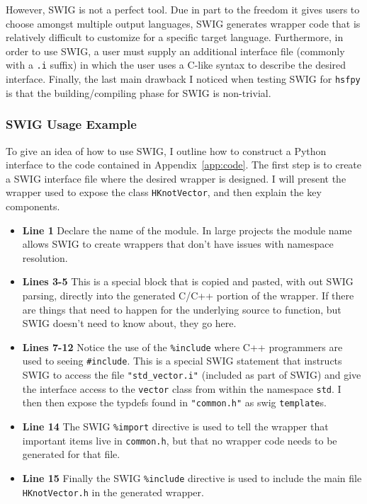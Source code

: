   However, SWIG is not a perfect tool. Due in part to the freedom it gives users to choose amongst multiple output languages, SWIG generates wrapper code that is relatively difficult to customize for a specific target language. Furthermore, in order to use SWIG, a user must supply an additional interface file (commonly with a \texttt{.i} suffix) in which the user uses a C-like syntax to describe the desired interface. Finally, the last main drawback I noticed when testing SWIG for \texttt{hsfpy} is that the building/compiling phase for SWIG is non-trivial.  

  \subsubsection{SWIG Usage Example} \label{ssub:swig_usage_example}

    To give an idea of how to use SWIG, I outline how to construct a Python interface to the code contained in Appendix~\ref{app:code}. The first step is to create a SWIG interface file where the desired wrapper is designed. I will present the wrapper used to expose the class \texttt{HKnotVector}, and then explain the key components.

    \vspace{.2in}
    

    \begin{itemize}
      \item \textbf{Line 1} Declare the name of the module. In large projects the module name allows SWIG to create wrappers that don't have issues with namespace resolution.
      \item \textbf{Lines 3-5} This is a special block that is copied and pasted, with out SWIG parsing, directly into the generated C/C++ portion of the wrapper. If there are things that need to happen for the underlying source to function, but SWIG doesn't need to know about, they go here.
      \item \textbf{Lines 7-12} Notice the use of the \texttt{\%include} where C++ programmers are used to seeing \texttt{\#include}. This is a special SWIG statement that instructs SWIG to access the file \texttt{"std\_vector.i"} (included as part of SWIG) and give the interface access to the \texttt{vector} class from within the namespace \texttt{std}. I then then expose the typdefs found in \texttt{"common.h"} as swig \texttt{template}s.
      \item \textbf{Line 14} The SWIG \texttt{\%import} directive is used to tell the wrapper that important items live in \texttt{common.h}, but that no wrapper code needs to be generated for that file.
      \item \textbf{Line 15} Finally the SWIG \texttt{\%include} directive is used to include the main file \texttt{HKnotVector.h} in the generated wrapper.
    \end{itemize}
    \mainstretch{}

